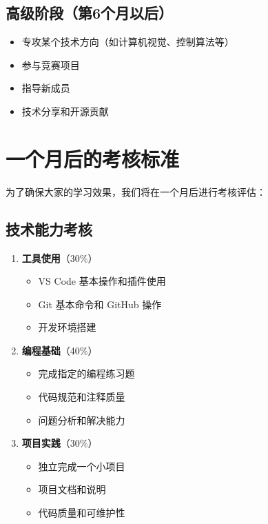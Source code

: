 \documentclass[a4paper,12pt]{article}
\begin{document}
\subsection{高级阶段（第6个月以后）}
\begin{itemize}
    \item 专攻某个技术方向（如计算机视觉、控制算法等）
    \item 参与竞赛项目
    \item 指导新成员
    \item 技术分享和开源贡献
\end{itemize}

\section{一个月后的考核标准}

为了确保大家的学习效果，我们将在一个月后进行考核评估：

\subsection{技术能力考核}
\begin{enumerate}
    \item \textbf{工具使用}（30\%）
    \begin{itemize}
        \item VS Code 基本操作和插件使用
        \item Git 基本命令和 GitHub 操作
        \item 开发环境搭建
    \end{itemize}

    \item \textbf{编程基础}（40\%）
    \begin{itemize}
        \item 完成指定的编程练习题
        \item 代码规范和注释质量
        \item 问题分析和解决能力
    \end{itemize}

    \item \textbf{项目实践}（30\%）
    \begin{itemize}
        \item 独立完成一个小项目
        \item 项目文档和说明
        \item 代码质量和可维护性
    \end{itemize}
\end{enumerate}
\end{document}
